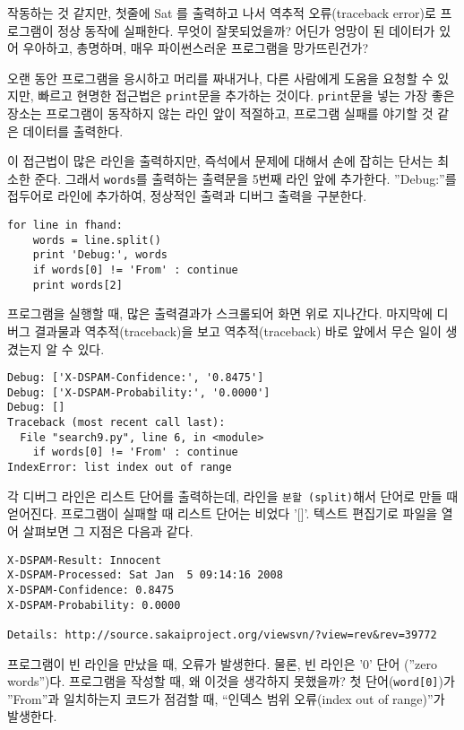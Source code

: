 \begin{enumerate}
작동하는 것 같지만, 첫줄에 Sat 를 출력하고 나서 역추적 오류(traceback error)로 프로그램이 정상 동작에 실패한다.
무엇이 잘못되었을까? 
어딘가 엉망이 된 데이터가 있어 우아하고, 총명하며, 매우 파이썬스러운 프로그램을 망가뜨린건가?

오랜 동안 프로그램을 응시하고 머리를 짜내거나, 다른 사람에게 도움을 요청할 수 있지만, 빠르고 현명한 접근법은 {\tt print}문을 추가하는 것이다.
{\tt print}문을 넣는 가장 좋은 장소는 프로그램이 동작하지 않는 라인 앞이 적절하고, 프로그램 실패를 야기할 것 같은 데이터를 출력한다.

이 접근법이 많은 라인을 출력하지만, 즉석에서 문제에 대해서 손에 잡히는 단서는 최소한 준다. 
그래서 {\tt words}를 출력하는 출력문을 5번째 라인 앞에 추가한다. 
''Debug:''를 접두어로 라인에 추가하여, 정상적인 출력과 디버그 출력을 구분한다.

\beforeverb
\begin{verbatim}
for line in fhand:
    words = line.split()
    print 'Debug:', words
    if words[0] != 'From' : continue
    print words[2]
\end{verbatim}
\afterverb
%

프로그램을 실행할 때, 많은 출력결과가 스크롤되어 화면 위로 지나간다. 
마지막에 디버그 결과물과 역추적(traceback)을 보고 역추적(traceback) 바로 앞에서 무슨 일이 생겼는지 알 수 있다.

\beforeverb
\begin{verbatim}
Debug: ['X-DSPAM-Confidence:', '0.8475']
Debug: ['X-DSPAM-Probability:', '0.0000']
Debug: []
Traceback (most recent call last):
  File "search9.py", line 6, in <module>
    if words[0] != 'From' : continue
IndexError: list index out of range
\end{verbatim}
\afterverb
%

각 디버그 라인은 리스트 단어를 출력하는데, 라인을 {\tt 분할 (split)}해서 단어로 만들 때 얻어진다.
프로그램이 실패할 때 리스트 단어는 비었다 '[]'. 
텍스트 편집기로 파일을 열어 살펴보면 그 지점은 다음과 같다.

\beforeverb
\begin{verbatim}
X-DSPAM-Result: Innocent
X-DSPAM-Processed: Sat Jan  5 09:14:16 2008
X-DSPAM-Confidence: 0.8475
X-DSPAM-Probability: 0.0000

Details: http://source.sakaiproject.org/viewsvn/?view=rev&rev=39772
\end{verbatim}
\afterverb
%

프로그램이 빈 라인을 만났을 때, 오류가 발생한다. 
물론, 빈 라인은 '0' 단어 (''zero words'')다.
프로그램을 작성할 때, 왜 이것을 생각하지 못했을까?
첫 단어(\verb"word[0]")가 ''From''과 일치하는지 코드가 점검할 때, ``인덱스 범위 오류(index out of range)''가 발생한다.


\end{enumerate}
